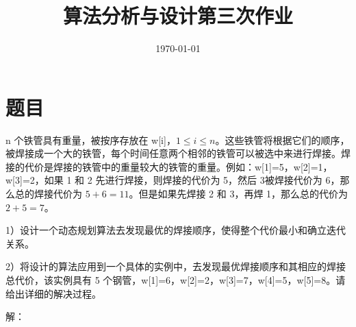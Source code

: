 \documentclass[UTF8]{ctexart}
\title{算法分析与设计第三次作业}
\author{}
\date{\today}
\begin{document}
\maketitle

\section{题目}

n 个铁管具有重量，被按序存放在 w[i]，$1 \le i \le n$。这些铁管将根据它们的顺序，被焊接成一个大的铁管，每个时间任意两个相邻的铁管可以被选中来进行焊接。焊接的代价是焊接的铁管中的重量较大的铁管的重量。例如：w[1]=5，w[2]=1，w[3]=2，如果 1 和 2 先进行焊接，则焊接的代价为 5，然后 3被焊接代价为 6，那么总的焊接代价为 $5+6=11$。但是如果先焊接 2 和 3，再焊 1，那么总的代价为$2+5=7$。
 
1）设计一个动态规划算法去发现最优的焊接顺序，使得整个代价最小和确立迭代关系。

2）将设计的算法应用到一个具体的实例中，去发现最优焊接顺序和其相应的焊接总代价，该实例具有 5 个钢管，w[1]=6，w[2]=2，w[3]=7，w[4]=5，w[5]=8。请给出详细的解决过程。

\noindent 解：
\end{document}
